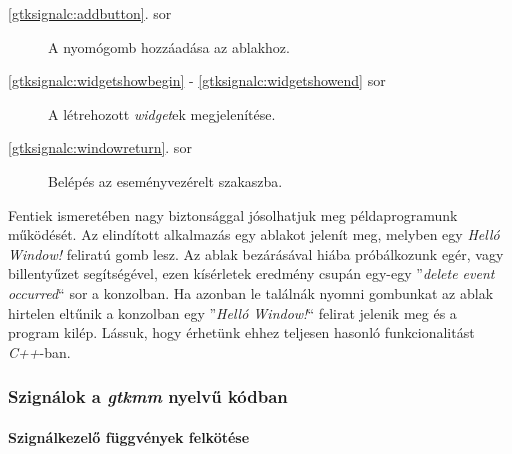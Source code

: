 \begin{description}
 \item[\ref{gtksignalc:addbutton}. sor] A nyomógomb hozzáadása az ablakhoz.

 \item[\ref{gtksignalc:widgetshowbegin} - \ref{gtksignalc:widgetshowend} sor] A létrehozott \textit{widget}ek megjelenítése.

 \item[\ref{gtksignalc:windowreturn}. sor] Belépés az eseményvezérelt szakaszba.
\end{description}

Fentiek ismeretében nagy biztonsággal jósolhatjuk meg példaprogramunk működését. Az elindított alkalmazás egy ablakot jelenít meg, melyben egy \textit{Helló Window!} feliratú gomb lesz. Az ablak bezárásával hiába próbálkozunk egér, vagy billentyűzet segítségével, ezen kísérletek eredmény csupán egy-egy ''\textit{delete event occurred}`` sor a konzolban. Ha azonban le találnák nyomni gombunkat az ablak hirtelen eltűnik a konzolban egy ''\textit{Helló Window!}`` felirat jelenik meg és a program kilép. Lássuk, hogy érhetünk ehhez teljesen hasonló funkcionalitást \textit{C++}-ban.

\subsubsection{Szignálok a \textit{gtkmm} nyelvű kódban}

\paragraph{Szignálkezelő függvények felkötése}

